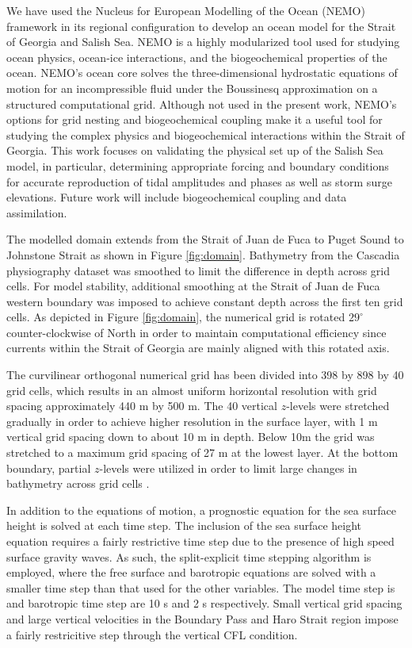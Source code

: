 \documentclass[pdftex,10pt]{article}
\begin{document}
We have used the Nucleus for European Modelling of the Ocean (NEMO) framework in its regional configuration to develop an ocean model for the Strait of Georgia and Salish Sea. NEMO is a highly modularized tool used for studying ocean physics, ocean-ice interactions, and the biogeochemical properties of the ocean. NEMO's ocean core solves the three-dimensional hydrostatic equations of motion for an incompressible fluid under the Boussinesq approximation on a structured computational grid. Although not used in the present work, NEMO's options for grid nesting and biogeochemical coupling make it a useful tool for studying the complex physics and biogeochemical interactions within the Strait of Georgia. This work focuses on validating the physical set up of the Salish Sea model, in particular, determining appropriate forcing and boundary conditions for accurate reproduction of tidal amplitudes and phases as well as storm surge elevations. Future work will include biogeochemical coupling and data assimilation. 

The modelled domain extends from the Strait of Juan de Fuca to Puget Sound to Johnstone Strait as shown in Figure \ref{fig:domain}. Bathymetry from the Cascadia physiography dataset \citep{haugerud1999digital} was smoothed to limit the difference in depth across grid cells. For model stability, additional smoothing at the Strait of Juan de Fuca western boundary was imposed to achieve constant depth across the first ten grid cells. As depicted in Figure \ref{fig:domain}, the numerical grid is rotated $29^{\circ}$ counter-clockwise of North in order to maintain computational efficiency since currents within the Strait of Georgia are mainly aligned with this rotated axis. 

The curvilinear orthogonal numerical grid has been divided into 398 by 898 by 40 grid cells, which results in an almost uniform horizontal resolution with grid spacing approximately 440 m by 500 m. The 40 vertical $z$-levels were stretched gradually in order to achieve higher resolution in the surface layer, with 1 m vertical grid spacing down to about 10 m in depth. Below 10m the grid was stretched to a maximum grid spacing of 27 m at the lowest layer. At the bottom boundary, partial $z$-levels were utilized in order to limit large changes in bathymetry across grid cells \citep{madec2012nemo}. 

In addition to the equations of motion, a prognostic equation for the sea surface height is solved at each time step. The inclusion of the sea surface height equation requires a fairly restrictive time step due to the presence of high speed surface gravity waves. As such, the split-explicit time stepping algorithm is employed, where the free surface and barotropic equations are solved with a smaller time step than that used for the other variables. The model time step is and barotropic time step are 10 s and 2 s respectively. Small vertical grid spacing and large vertical velocities in the Boundary Pass and Haro Strait region impose a fairly restricitive step through the vertical CFL condition.
\end{document}
